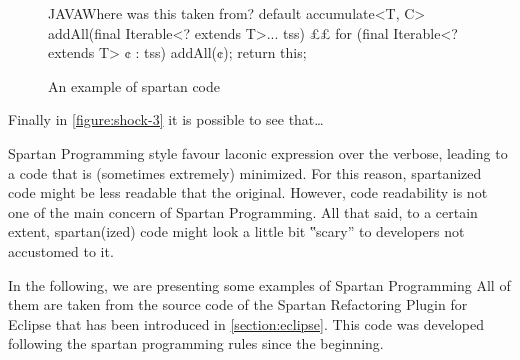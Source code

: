 \begin{figure}
\label{figure:shock-2}
\caption{An example of spartan code}
\begin{Code}{JAVA}{Where was this taken from?}
default accumulate<T, C>
addAll(final Iterable<? extends T>... tss) {££
for (final Iterable<? extends T> ¢ : tss)
addAll(¢);
return this;
}
\end{Code}

\end{figure}
Finally in \cref{figure:shock-3} it is possible to see that…

Spartan Programming style favour laconic expression over the verbose, leading
to a code that is (sometimes extremely) minimized. For this reason, spartanized
code might be less readable that the original. However, code readability is not
one of the main concern of Spartan Programming. All that said, to a certain
extent, spartan(ized) code might look a little bit ‟scary” to developers not
accustomed to it.

In the following, we are presenting some examples of Spartan
Programming %
All of them are taken from the source code of the Spartan Refactoring Plugin
for Eclipse that has been introduced in \cref{section:eclipse}. This code was
developed following the spartan programming rules since the beginning.



